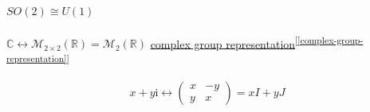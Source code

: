 \documentclass[
]{book}
\theoremstyle{definition}
\theoremstyle{definition}
\theoremstyle{definition}
\theoremstyle{definition}
\theoremstyle{remark}
\begin{document}
\hypertarget{soleft2rightcong-uleft1right}{%
\paragraph{\texorpdfstring{\(SO\left(2\right)\cong U\left(1\right)\)}{SO\textbackslash left(2\textbackslash right)\textbackslash cong U\textbackslash left(1\textbackslash right)}}\label{soleft2rightcong-uleft1right}}

\(\mathbb{C}\leftrightarrow\mathcal{M}_{2\times2}\left(\mathbb{R}\right)=\mathcal{M}_{2}\left(\mathbb{R}\right)\) \protect\hyperlink{complex-group-representation}{complex group representation}\textsuperscript{{[}\ref{complex-group-representation}{]}}

\[
x+y\mathrm{i}\leftrightarrow\begin{pmatrix}x & -y\\
y & x
\end{pmatrix}=xI+yJ
\]
\end{document}
